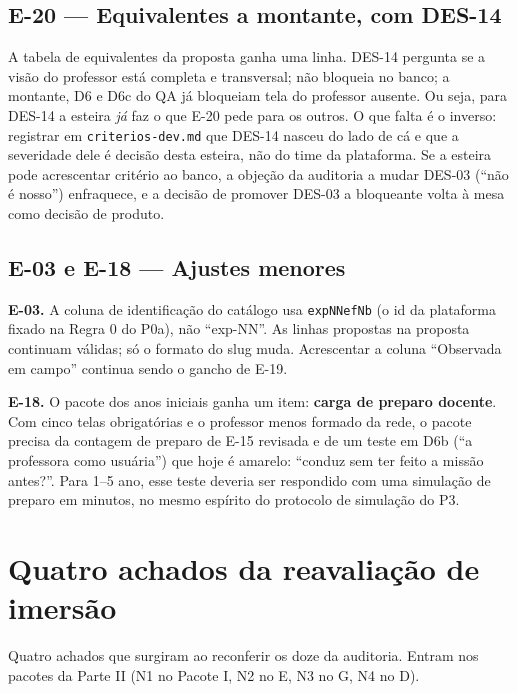 \documentclass[11pt,a4paper]{article}
\begin{document}
\subsection{E-20 --- Equivalentes a montante, com DES-14}
\label{sec:e20}

A tabela de equivalentes da proposta ganha uma linha. DES-14 pergunta se a visão do professor está
completa e transversal; não bloqueia no banco; a montante, D6 e D6c do QA já bloqueiam tela do
professor ausente. Ou seja, para DES-14 a esteira \emph{já} faz o que E-20 pede para os outros. O que
falta é o inverso: registrar em \texttt{criterios-dev.md} que DES-14 nasceu do lado de cá e que a
severidade dele é decisão desta esteira, não do time da plataforma. Se a esteira pode acrescentar
critério ao banco, a objeção da auditoria a mudar DES-03 (``não é nosso'') enfraquece, e a decisão
de promover DES-03 a bloqueante volta à mesa como decisão de produto.

\subsection{E-03 e E-18 --- Ajustes menores}

\textbf{E-03.} A coluna de identificação do catálogo usa \texttt{expNNefNb} (o id da plataforma
fixado na Regra 0 do P0a), não ``exp-NN''. As linhas propostas na proposta continuam válidas; só o
formato do slug muda. Acrescentar a coluna ``Observada em campo'' continua sendo o gancho de E-19.

\textbf{E-18.} O pacote dos anos iniciais ganha um item: \textbf{carga de preparo docente}. Com cinco
telas obrigatórias e o professor menos formado da rede, o pacote precisa da contagem de preparo de
E-15 revisada e de um teste em D6b (``a professora como usuária'') que hoje é amarelo: ``conduz sem
ter feito a missão antes?''. Para 1\textordmasculine{}--5\textordmasculine{} ano, esse teste deveria
ser respondido com uma simulação de preparo em minutos, no mesmo espírito do protocolo de simulação
do P3.

\section{Quatro achados da reavaliação de imersão}
\label{sec:novos}

Quatro achados que surgiram ao reconferir os doze da auditoria. Entram nos pacotes da Parte II (N1 no Pacote I, N2 no E, N3 no G, N4 no D).
\end{document}
